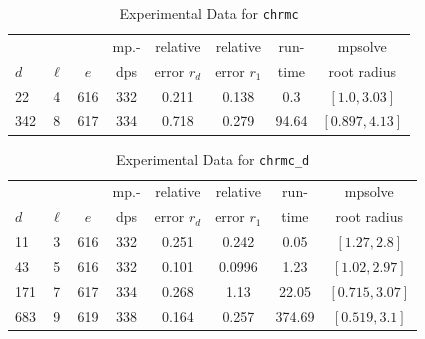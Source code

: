 \documentclass[runningheads]{llncs}
\begin{document}
\begin{table}
\caption{Experimental Data for \texttt{chrmc}} %
\label{tab:chrmc}
\vskip -0.15in
\begin{center}
\begin{small}
\begin{sc}
\begin{tabular}{lccccccc}
\toprule
&  &  & mp.-& relative  & relative & run- & mpsolve \\
$d$& $\ell$& $e$ & dps&error $r_d$       & error $r_1$ &time& root radius\\
\midrule
 22 & 4 & 616 & 332 & 0.211 & 0.138 & 0.3 & $[1.0, 3.03]$\\
 342 & 8 & 617 & 334 & 0.718 & 0.279 & 94.64 & $[0.897, 4.13]$\\
\bottomrule
\end{tabular}
\end{sc}
\end{small}
\end{center}
\vskip 0.05in
\end{table}


\begin{table}
\caption{Experimental Data for \texttt{chrmc\_d}} %
\label{tab:chrmc_d}
\vskip -0.15in
\begin{center}
\begin{small}
\begin{sc}
\begin{tabular}{lccccccc}
\toprule
&  &  & mp.-& relative  & relative & run- & mpsolve \\
$d$& $\ell$& $e$ & dps&error $r_d$       & error $r_1$ &time& root radius\\
\midrule
11 & 3 & 616 & 332 & 0.251 & 0.242 & 0.05 & $[1.27, 2.8]$\\
 43 & 5 & 616 & 332 & 0.101 & 0.0996 & 1.23 & $[1.02, 2.97]$\\
 171 & 7 & 617 & 334 & 0.268 & 1.13 & 22.05 & $[0.715, 3.07]$\\
 683 & 9 & 619 & 338 & 0.164 & 0.257 & 374.69 & $[0.519, 3.1]$\\
\bottomrule
\end{tabular}
\end{sc}
\end{small}
\end{center}
\vskip 0.05in
\end{table}
\end{document}
